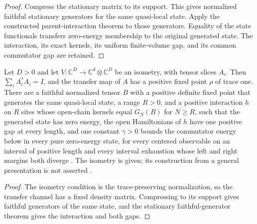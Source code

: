 \begin{proof}\leanok
    Compress the stationary matrix to its support. This gives normalized
    faithful stationary generators for the same quasi-local state.
    Apply the constructed parent-interaction theorem to those generators.
    Equality of the state functionals transfers zero-energy membership
    to the original generated state. The interaction, its exact kernels,
    its uniform finite-volume gap, and its common commutator gap are retained.
\end{proof}

\begin{lemma}
    \label{thm:supplied_isometry_parent_gap}
    \leanok
    Let $D>0$ and let $V:\mathbb C^D\to\mathbb C^d\otimes\mathbb C^D$ be an
    isometry, with tensor slices $A_i$. Then $\sum_iA_i^*A_i=I$, and the
    transfer map of $A$ has a positive fixed point $\rho$ of trace one.
    There are a faithful normalized tensor $B$ with a positive
    definite fixed point that generates the same quasi-local state, a range
    $R>0$, and a positive interaction $h$ on $R$ sites whose open-chain
    kernels equal $G_N(B)$ for $N\geq R$, such that the generated state has
    zero energy, the open Hamiltonians of $h$ have one positive gap at every
    length, and one constant $\gamma>0$ bounds the commutator energy below in
    every pure zero-energy state, for every centered observable on an
    interval of positive length and every interval exhaustion whose left
    and right margins both diverge \cite[equation~(3.6), Theorems~1.1--1.2,
        and Section~6]{Nachtergaele1996Spectral}. The isometry is given; its
    construction from a general presentation is not asserted
    \cite{gap:nachtergaele96_infinite_volume_ground_projection}.
\end{lemma}
\begin{proof}\leanok
    The isometry condition is the trace-preserving normalization, so the
    transfer channel has a fixed density matrix. Compressing to its support
    gives faithful generators of the same state, and the stationary
    faithful-generator theorem gives the interaction and both gaps.
\end{proof}

